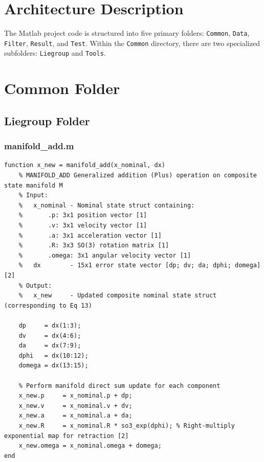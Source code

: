 \documentclass[twocolumn,10pt]{article}
\begin{document}
\section{Architecture Description}
The Matlab project code is structured into five primary folders: \texttt{Common}, \texttt{Data}, \texttt{Filter}, \texttt{Result}, and \texttt{Test}. Within the \texttt{Common} directory, there are two specialized subfolders: \texttt{Liegroup} and \texttt{Tools}.

\section{Common Folder}
\subsection{Liegroup Folder}

\subsubsection{manifold\_add.m}
\begin{lstlisting}
function x_new = manifold_add(x_nominal, dx)
    % MANIFOLD_ADD Generalized addition (Plus) operation on composite state manifold M
    % Input: 
    %   x_nominal - Nominal state struct containing:
    %       .p: 3x1 position vector [1]
    %       .v: 3x1 velocity vector [1]
    %       .a: 3x1 acceleration vector [1]
    %       .R: 3x3 SO(3) rotation matrix [1]
    %       .omega: 3x1 angular velocity vector [1]
    %   dx        - 15x1 error state vector [dp; dv; da; dphi; domega] [2]
    % Output:
    %   x_new     - Updated composite nominal state struct (corresponding to Eq 13)
    
    dp     = dx(1:3);
    dv     = dx(4:6);
    da     = dx(7:9);
    dphi   = dx(10:12);
    domega = dx(13:15);
    
    % Perform manifold direct sum update for each component
    x_new.p     = x_nominal.p + dp;
    x_new.v     = x_nominal.v + dv;
    x_new.a     = x_nominal.a + da;
    x_new.R     = x_nominal.R * so3_exp(dphi); % Right-multiply exponential map for retraction [2]
    x_new.omega = x_nominal.omega + domega;
end
\end{lstlisting}
\end{document}

